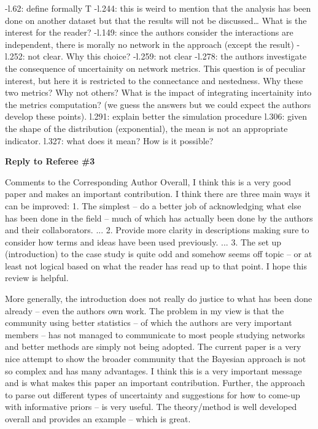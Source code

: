 \documentclass[12pt]{letter}
\newenvironment{refquote}{\bigskip \begin{it}}{\end{it}\smallskip}
\begin{document}
	-l.62: define formally T
	-l.244: this is weird to mention that the analysis has been done on another dataset but that the results will not be discussed… What is the interest for the reader?
	-l.149: since the authors consider the interactions are independent, there is morally no network in the approach (except the result)
	-l.252: not clear. Why this choice?
	-l.259: not clear
	-l.278: the authors investigate the consequence of uncertainity on network metrics. This question is of peculiar interest, but here it is restricted to the connectance and nestedness. Why these two metrics? Why not others? What is the impact of integrating incertainity into the metrics computation? (we guess the answers but we could expect the authors develop these points).
	l.291: explain better the simulation procedure
	l.306: given the shape of the distribution (exponential), the mean is not an appropriate indicator.
	l.327: what does it mean? How is it possible?


{\Large \bf Reply to Referee \#3}

	\begin{refquote}
		Comments to the Corresponding Author
		Overall, I think this is a very good paper and makes an important contribution.  I think there are three main ways it can be improved: 1.      The simplest – do a better job of acknowledging what else has been done in the field – much of which has actually been done by the authors and their collaborators. ... 2.      Provide more clarity in descriptions making sure to consider how terms and ideas have been used previously. ... 3.      The set up (introduction) to the case study is quite odd and somehow seems off topic – or at least not logical based on what the reader has read up to that point.
		I hope this review is helpful.  


		More generally, the introduction does not really do justice to what has been done already – even the authors own work.  The problem in my view is that the community using better statistics – of which the authors are very important members – has not managed to communicate to most people studying networks and better methods are simply not being adopted.  The current paper is a very nice attempt to show the broader community that the Bayesian approach is not so complex and has many advantages.  I think this is a very important message and is what makes this paper an important contribution.  Further, the approach to parse out different types of uncertainty and suggestions for how to come-up with informative priors – is very useful.  The theory/method is well developed overall and provides an example – which is great.

		\end{refquote}
\end{document}

